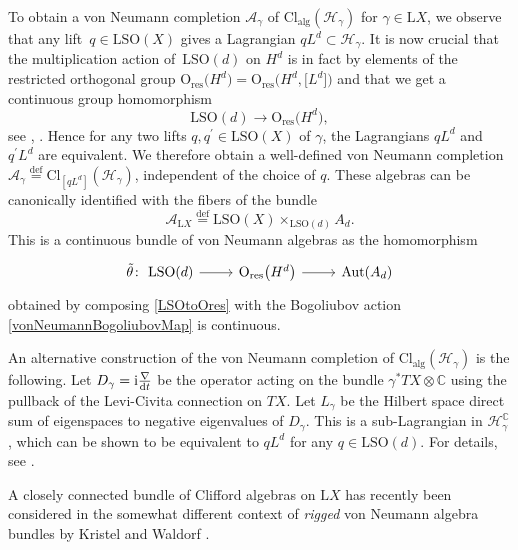 \documentclass[11pt]{article}
\numberwithin{equation}{section}
\numberwithin{equation}{section}
\newcommand{\C}{\mathbb{C}}
\newcommand{\A}{\mathcal{A}}
\newcommand{\Cl}{\mathrm{Cl}}
\newcommand{\SO}{\mathrm{SO}}
\newcommand{\res}{\mathrm{res}}
\newcommand{\Aut}{\mathrm{Aut}}
\renewcommand{\O}{\mathrm{O}}
\renewcommand{\L}{\mathrm{L}}
\newcommand{\defeq}{\stackrel{\mathrm{def}}{=}}
\begin{document}
To obtain a von Neumann completion $\A_\gamma$ of $\Cl_{\mathrm{alg}}(\mathcal{H}_\gamma)$ for $\gamma \in \L X$, we observe that any lift~${q \in \L \SO(X)}$ gives a Lagrangian $q L^d \subset \mathcal{H}_\gamma$.
It is now crucial that the multiplication action of~$\L\SO(d)$ on $H^d$ is in fact by elements of the restricted orthogonal group $\O_{\res}\big(H^d\big) = \O_{\res}\big(H^d, \big[L^d\big]\big)$ and that we get a continuous group homomorphism
\begin{equation} \label{LSOtoOres}
 \L\SO(d) \longrightarrow \O_{\res}\big(H^d\big),
\end{equation}
see \cite[Proposition~6.3.1]{PressleySegal}, \cite[Proposition~3.23]{KristelWaldorf1}.
Hence for any two lifts $q, q^\prime \in \L \SO(X)$ of $\gamma$, the Lagrangians $q L^d$ and $q^\prime L^d$ are equivalent.
We therefore obtain a well-defined von Neumann completion $\A_\gamma \defeq \Cl_{[q L^d]}(\mathcal{H}_\gamma)$, independent of the choice of $q$.
These algebras can be canonically identified with the fibers of the bundle
\begin{equation} \label{vNBundleAsAssociatedBundle}
 \A_{\L X} \defeq \L \SO(X) \times_{\L\SO(d)} A_d.
\end{equation}
This is a continuous bundle of von Neumann algebras as the homomorphism
\begin{equation} \label{ThetaTilde}
\begin{tikzcd}
\tilde{\theta}\colon \ \L \SO(d) \ar[r] & \O_{\res}\big(H^d\big) \ar[r] & \Aut(A_d)
\end{tikzcd}
\end{equation}
obtained by composing \eqref{LSOtoOres} with the Bogoliubov action \eqref{vonNeumannBogoliubovMap} is continuous.

\begin{Remark}
An alternative construction of the von Neumann completion of $\Cl_{\mathrm{alg}}(\mathcal{H}_\gamma)$ is the following.
Let $D_\gamma = \mathrm{i}\frac{\nabla}{{\rm d}t}$ be the operator acting on the bundle $\gamma^*T X \otimes \C$ using the pullback of the Levi-Civita connection on $TX$.
Let $L_\gamma$ be the Hilbert space direct sum of eigenspaces to negative eigenvalues of $D_\gamma$.
This is a sub-Lagrangian in $\mathcal{H}_\gamma^\C$, which can be shown to be equivalent to $q L^d$ for any $q \in \L\SO(d)$.
For details, see \cite[Section~1.3]{LudewigSpinorBundle}.
\end{Remark}

\begin{Remark}
A closely connected bundle of Clifford algebras on $\L X$ has recently been considered in the somewhat different context of \emph{rigged} von Neumann algebra bundles by Kristel and Waldorf \cite{KristelWaldorf2}.
\end{Remark}
\end{document}

